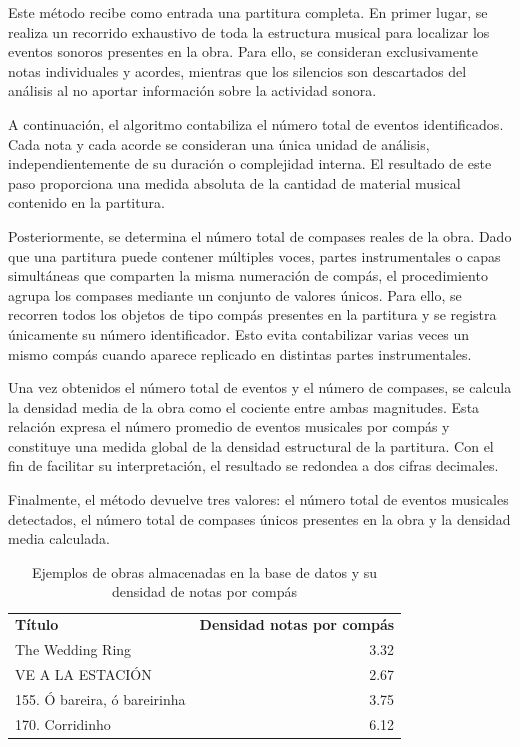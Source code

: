 Este método recibe como entrada una partitura completa. En primer lugar, se realiza un recorrido exhaustivo de toda la estructura musical para localizar los eventos sonoros presentes en la obra. Para ello, se consideran exclusivamente notas individuales y acordes, mientras que los silencios son descartados del análisis al no aportar información sobre la actividad sonora.

A continuación, el algoritmo contabiliza el número total de eventos identificados. Cada nota y cada acorde se consideran una única unidad de análisis, independientemente de su duración o complejidad interna. El resultado de este paso proporciona una medida absoluta de la cantidad de material musical contenido en la partitura.

Posteriormente, se determina el número total de compases reales de la obra. Dado que una partitura puede contener múltiples voces, partes instrumentales o capas simultáneas que comparten la misma numeración de compás, el procedimiento agrupa los compases mediante un conjunto de valores únicos. Para ello, se recorren todos los objetos de tipo compás presentes en la partitura y se registra únicamente su número identificador. Esto evita contabilizar varias veces un mismo compás cuando aparece replicado en distintas partes instrumentales.

Una vez obtenidos el número total de eventos y el número de compases, se calcula la densidad media de la obra como el cociente entre ambas magnitudes. Esta relación expresa el número promedio de eventos musicales por compás y constituye una medida global de la densidad estructural de la partitura. Con el fin de facilitar su interpretación, el resultado se redondea a dos cifras decimales.

Finalmente, el método devuelve tres valores: el número total de eventos musicales detectados, el número total de compases únicos presentes en la obra y la densidad media calculada.

\begin{table}[H]
\centering
\begin{tabular}{lr}
\textbf{Título} & \textbf{Densidad notas por compás} \\
The Wedding Ring & 3.32 \\
VE A LA ESTACIÓN & 2.67 \\
155. Ó bareira, ó bareirinha & 3.75 \\
170. Corridinho & 6.12 \\
\end{tabular}
\caption{Ejemplos de obras almacenadas en la base de datos y su densidad de notas por compás}
\end{table}

